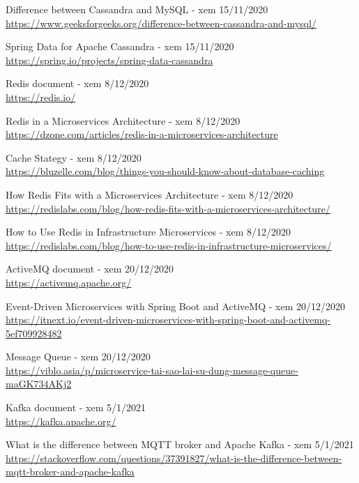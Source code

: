 \documentclass[12pt,a4paper,oneside]{book}
\begin{document}
\begin{thebibliography}{80}
        \bibitem{} Difference between Cassandra and MySQL - xem 15/11/2020\\
        \url{https://www.geeksforgeeks.org/difference-between-cassandra-and-mysql/}
        
        \bibitem{} Spring Data for Apache Cassandra - xem 15/11/2020\\
        \url{https://spring.io/projects/spring-data-cassandra}
        
         Redis document - xem 8/12/2020\\
        \url{https://redis.io/}
        
        \bibitem{} Redis in a Microservices Architecture - xem 8/12/2020\\
        \url{https://dzone.com/articles/redis-in-a-microservices-architecture}
        
         Cache Stategy - xem 8/12/2020\\
        \url{https://bluzelle.com/blog/things-you-should-know-about-database-caching}
        
        \bibitem{} How Redis Fits with a Microservices Architecture - xem 8/12/2020\\
        \url{https://redislabs.com/blog/how-redis-fits-with-a-microservices-architecture/}
        
        \bibitem{} How to Use Redis in Infrastructure Microservices - xem 8/12/2020\\
        \url{https://redislabs.com/blog/how-to-use-redis-in-infrastructure-microservices/}
        
         ActiveMQ document - xem 20/12/2020\\
        \url{https://activemq.apache.org/}
        
        \bibitem{} Event-Driven Microservices with Spring Boot and ActiveMQ - xem 20/12/2020\\
        \url{https://itnext.io/event-driven-microservices-with-spring-boot-and-activemq-5ef709928482}
		
         Message Queue - xem 20/12/2020\\
        \url{https://viblo.asia/p/microservice-tai-sao-lai-su-dung-message-queue-maGK734AKj2}
        
         Kafka document - xem 5/1/2021\\
        \url{https://kafka.apache.org/}
        
        \bibitem{} What is the difference between MQTT broker and Apache Kafka - xem 5/1/2021\\
        \url{https://stackoverflow.com/questions/37391827/what-is-the-difference-between-mqtt-broker-and-apache-kafka}
        

\end{thebibliography}
\end{document}
